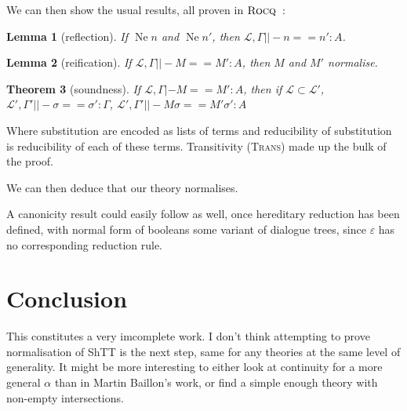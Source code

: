 \documentclass[11pt]{article}
\newtheorem{theorem}{Theorem}[section]
\newtheorem{lemma}[theorem]{Lemma}
\DeclareMathOperator{\neu}{Ne}
\newcommand{\0}{\mathbf{0}}
\newcommand{\1}{\mathbf{1}}
\newcommand{\tctx}{\Gamma}
\newcommand{\fctx}{\mathcal{L}}
\begin{document}
We can then show the usual results, all proven in $\textsc{Rocq}$~:

\begin{lemma}[reflection]
    If $\neu n$ and $\neu n'$, then $\fctx,\tctx ||- n == n' : A$.
\end{lemma}
\begin{lemma}[reification]
    If $\fctx,\tctx ||- M == M' : A$, then $M$ and $M'$ normalise.
\end{lemma}

\begin{theorem}[soundness]
    If $\fctx,\tctx |- M == M' : A$, then if $\fctx \subset \fctx'$, $\fctx',\tctx'||-\sigma == \sigma' : \Gamma$, $\fctx',\tctx' ||- M\sigma == M'\sigma' : A$
\end{theorem}
Where substitution are encoded as lists of terms and reducibility of substitution is reducibility of each of these terms. Transitivity (\textsc{Trans}) made up the bulk of the proof.

We can then deduce that our theory normalises.

A canonicity result could easily follow as well, once hereditary reduction has been defined, with normal form of booleans some variant of dialogue trees, since $\varepsilon$ has no corresponding reduction rule.
\section{Conclusion}

This constitutes a very imcomplete work. I don't think attempting to prove normalisation of ShTT is the next step, same for any theories at the same level of generality. It might be more interesting to either look at continuity for a more general $\alpha$ than in Martin Baillon's work, or find a simple enough theory with non-empty intersections.

%
%

\printbibliography
\end{document}
